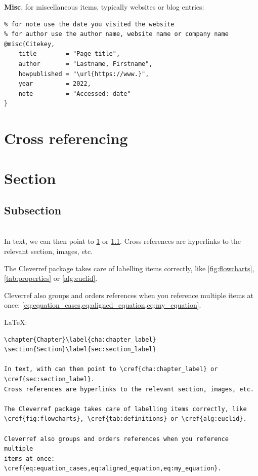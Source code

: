 \documentclass[12pt,nonacm,acmlarge,titlepage,screen]{acmart}
\begin{document}
\noindent \textbf{Misc}, for miscellaneous items, typically websites or blog entries:
\begin{Verbatim}[frame=single]
% for year use the date of publication,
% for note use the date you visited the website
% for author use the author name, website name or company name
@misc{Citekey,
    title        = "Page title",
    author       = "Lastname, Firstname",
    howpublished = "\url{https://www.}",
    year         = 2022,
    note         = "Accessed: date"
}
\end{Verbatim}

\section*{Cross referencing}

\noindent\begin{minipage}[t]{\textwidth}
\section{Section}\label{cha:chapter_label}
\subsection{Subsection}\label{sec:section_label}
\end{minipage}~\\

In text, we can then point to \cref{cha:chapter_label} or \cref{sec:section_label}. Cross references are hyperlinks to the relevant section, images, etc.

The Cleverref package takes care of labelling items correctly, like \cref{fig:flowcharts}, \cref{tab:properties} or \cref{alg:euclid}. 

Cleverref also groups and orders references when you reference multiple items at once: \cref{eq:equation_cases,eq:aligned_equation,eq:my_equation}.

\noindent\LaTeX:
\begin{Verbatim}[frame=single]
% add labels to items you want to reference
\chapter{Chapter}\label{cha:chapter_label}
\section{Section}\label{sec:section_label}

In text, with can then point to \cref{cha:chapter_label} or 
\cref{sec:section_label}. 
Cross references are hyperlinks to the relevant section, images, etc.

The Cleverref package takes care of labelling items correctly, like 
\cref{fig:flowcharts}, \cref{tab:definitions} or \cref{alg:euclid}. 

Cleverref also groups and orders references when you reference multiple
items at once:
\cref{eq:equation_cases,eq:aligned_equation,eq:my_equation}.
\end{Verbatim}
\end{document}
